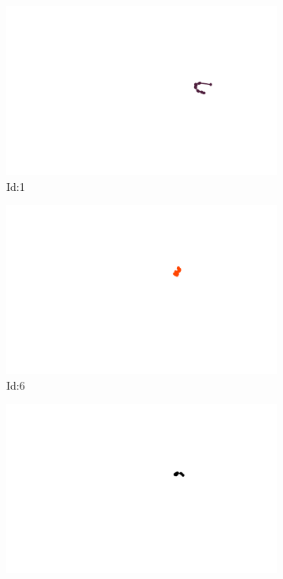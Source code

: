 \documentclass[12pt,twoside]{report}
\begin{document}
\begin{figure}
\centering
\begin{subfigure}[b]{0.20\textwidth}
\centering
\includegraphics[width=\textwidth]{../trajectories/1.png}
\caption{Id:1}
\end{subfigure}
\begin{subfigure}[b]{0.20\textwidth}
\centering
\includegraphics[width=\textwidth]{../trajectories/6.png}
\caption{Id:6}
\end{subfigure}
\begin{subfigure}[b]{0.20\textwidth}
\centering
\includegraphics[width=\textwidth]{../trajectories/7.png}

\end{subfigure}
\end{figure}
\end{document}
